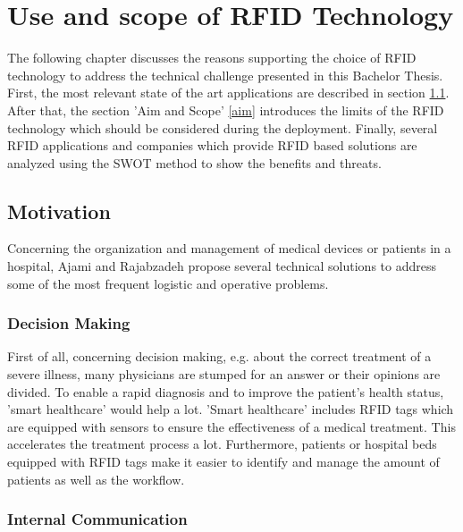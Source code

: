 \chapter{Use and scope of RFID Technology}
\label{Kap1}

The following chapter discusses the reasons supporting the choice of \ac{RFID} technology to address the technical challenge presented in this Bachelor Thesis. First, the most relevant state of the art applications are described in section \ref{motivation}. After that, the section 'Aim and Scope' \ref{aim} introduces the limits of the RFID technology which should be considered during the deployment. Finally, several RFID applications and companies which provide RFID based solutions are analyzed using the \ac{SWOT} method to show the benefits and threats.

\section{Motivation} \label{motivation}

Concerning the organization and management of medical devices or patients in a hospital, Ajami and Rajabzadeh propose several technical solutions to address some of the most frequent logistic and operative problems.

\subsection{Decision Making}

First of all, concerning decision making, e.g. about the correct treatment of a severe illness, many physicians are stumped for an answer or their opinions are divided. To enable a rapid diagnosis and to improve the patient's health status, 'smart healthcare' \cite{henrici} would help a lot. 'Smart healthcare' includes RFID tags which are equipped with sensors to ensure the effectiveness of a medical treatment. This accelerates the treatment process a lot. Furthermore, patients or hospital beds equipped with RFID tags make it easier to identify and manage the amount of patients as well as the workflow.

\subsection{Internal Communication} \label{internalcomm}

